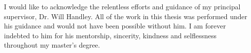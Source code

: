 
\begin{acknowledgements}      


I would like to acknowledge the relentless efforts and guidance of my principal supervisor, Dr. Will Handley. All of the work in this thesis was performed under his guidance and would not have been possible without him. I am forever indebted to him for his mentorship, sincerity, kindness and selflessness throughout my master's degree.

\end{acknowledgements}
